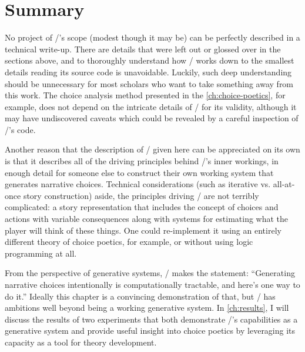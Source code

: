 \section{Summary}

No project of \dunyazad/'s scope (modest though it may be) can be perfectly described in a technical write-up.
%
There are details that were left out or glossed over in the sections above, and to thoroughly understand how \dunyazad/ works down to the smallest details reading its source code is unavoidable.
%
%
Luckily, such deep understanding should be unnecessary for most scholars who want to take something away from this work.
%
The choice analysis method presented in the \cref{ch:choice-poetics}, for example, does not depend on the intricate details of \dunyazad/ for its validity, although it may have undiscovered caveats which could be revealed by a careful inspection of \dunyazad/'s code.


Another reason that the description of \dunyazad/ given here can be appreciated on its own is that it describes all of the driving principles behind \dunyazad/'s inner workings, in enough detail for someone else to construct their own working system that generates narrative choices.
%
Technical considerations (such as iterative vs. all-at-once story construction) aside, the principles driving \dunyazad/ are not terribly complicated: a story representation that includes the concept of choices and actions with variable consequences along with systems for estimating what the player will think of these things.
%
One could re-implement it using an entirely different theory of choice poetics, for example, or without using logic programming at all.


From the perspective of generative systems, \dunyazad/ makes the statement: ``Generating narrative choices intentionally is computationally tractable, and here's one way to do it.''
%
Ideally this chapter is a convincing demonstration of that, but \dunyazad/ has ambitions well beyond being a working generative system.
%
In \cref{ch:results}, I will discuss the results of two experiments that both demonstrate \dunyazad/'s capabilities as a generative system and provide useful insight into choice poetics by leveraging its capacity as a tool for theory development.

\label{sec:dunyazad-summary}%
